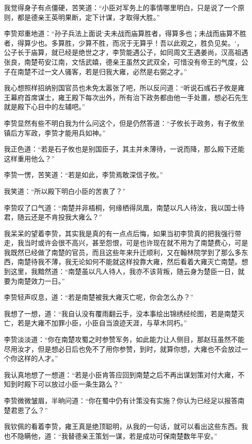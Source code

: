 我觉得身子有点僵硬，苦笑道：“小臣对军务上的事情哪里明白，只是说了一个原则，都是德亲王英明果断，定下计谋，才取得大胜。”

李贽郑重地道：“孙子兵法上面说‘夫未战而庙算胜者，得算多也；未战而庙算不胜者，得算少也。多算胜，少算不胜，而况于无算乎！吾以此观之，胜负见矣。‘，公子长于庙算，就已经是绝世之才，李贽能遇公子，如同周文王遇姜尚，汉高祖遇张良，南楚苟安江南，文恬武嬉，德亲王虽然文武双全，可惜没有帝王的气度，公子在南楚不过一文人骚客，若是归我大雍，必然是右弼之才。”

我心想照样招纳别国官员也未免太嚣张了吧，所以反问道：“听说石彧石子攸是雍王幕府首席谋士，雍王殿下每次出外，所有治下政务都由他一手处置，想必石先生就是殿下心目中的左辅吧。”

李贽显然有些不明白我为什么问这个，但是仍然答道：“子攸长于政务，有子攸坐镇后方军政，李贽才能用兵如神。”

我正色道：“若是石子攸也是别国臣子，其主并未薄待，一说而降，那么殿下还能这样重用他么？”

李贽一愣，苦笑道：“若是如此，李贽焉敢深信子攸。”

我笑道：“所以殿下明白小臣的苦衷了？”

李贽叹了口气道：“南楚并非梧桐，何缘栖得凤凰，南楚以凡人待汝，我以国士待君，随云还是不肯投我大雍么？”

我呆呆的望着李贽，其实我是真的有一点点后悔，如果当初李贽真的把我强行带走，我当时或许会很不高兴，甚至怨恨，可是也许现在就不用为了南楚费心，可是我既然已经做了南楚的官员，而且这些年来升迁顺利，又在翰林院学到了那么多东西，南楚待我不薄，我无论如何不能就这样投靠大雍，然后看着大雍灭亡南楚。想到这里，我黯然道：“南楚虽以凡人待人，我亦不该背叛，随云身为楚臣一日，就要为南楚效力一日。”

李贽轻声叹息，道：“若是南楚被我大雍灭亡呢，你会怎么办？”

我想了一想，道：“我自认没有覆雨翻云手，没本事绘出锦绣经纶图，若是南楚灭亡，若是大雍不加罪小臣，小臣自当浪迹天涯，与草木同朽。”

李贽淡淡道：“你在南楚攻蜀之时参赞军务，如此能力让人侧目，那赵珏虽然不能尽用汝才，但是想必日后也免不了用你参赞，到时，就算你想，大雍也不会放过一个你这样的人才。”

我认真地想了一想道：“若是小臣肯答应回到南楚之后不再出谋划策对付大雍，不知到时殿下可以放过小臣一条生路么？”

李贽微微皱眉，半晌问道：“你在蜀中仍有计策没有实施？你认为已经足以报答南楚君恩了么？”

我钦佩的看着李贽，雍王真是绝顶聪明，从我的一句话，就可以看出这些东西。我也不隐瞒他，道：“我替德亲王策划一谋，若是成功可保南楚数年平安。”

